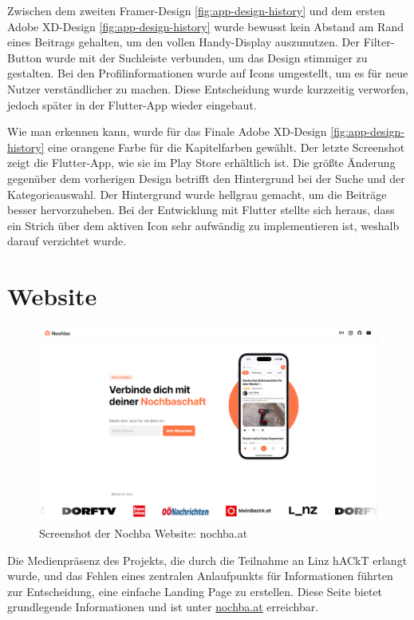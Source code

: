 Zwischen dem zweiten Framer-Design
\ref{fig:app-design-history} und dem ersten Adobe XD-Design
\ref{fig:app-design-history} wurde bewusst kein Abstand am
Rand eines Beitrags gehalten, um den vollen Handy-Display
auszunutzen. Der Filter-Button wurde mit der Suchleiste
verbunden, um das Design stimmiger zu gestalten. Bei den
Profilinformationen wurde auf Icons umgestellt, um es für
neue Nutzer verständlicher zu machen. Diese Entscheidung
wurde kurzzeitig verworfen, jedoch später in der Flutter-App
wieder eingebaut.

Wie man erkennen kann, wurde für das Finale Adobe
XD-Design \ref{fig:app-design-history} eine orangene Farbe für die Kapitelfarben
gewählt. Der letzte Screenshot zeigt die Flutter-App, wie
sie im Play Store erhältlich ist. Die größte Änderung
gegenüber dem vorherigen Design betrifft den Hintergrund
bei der Suche und der Kategorieauswahl. Der Hintergrund
wurde hellgrau gemacht, um die Beiträge besser hervorzuheben.
Bei der Entwicklung mit Flutter stellte sich heraus, dass
ein Strich über dem aktiven Icon sehr aufwändig zu
implementieren ist, weshalb darauf verzichtet wurde.




\section{Website}
\begin{figure}[h]
  \includegraphics[width=1\textwidth]{pics/website-design.png}
  \caption{Screenshot der Nochba Website: nochba.at}
\end{figure}

Die Medienpräsenz des Projekts, die durch die Teilnahme an Linz hACkT erlangt wurde, und das Fehlen eines zentralen Anlaufpunkts für Informationen führten zur Entscheidung, eine einfache Landing Page zu erstellen. Diese Seite bietet grundlegende Informationen und ist unter \href{https://nochba.at}{nochba.at} erreichbar.

